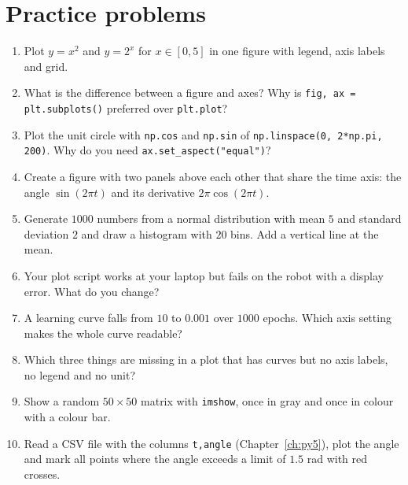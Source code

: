 \section*{Practice problems}
\begin{enumerate}[label=\textbf{\thechapter.\arabic*}]
  \item Plot $y=x^2$ and $y=2^x$ for $x\in[0,5]$ in one figure with legend, axis labels and grid.
  \item What is the difference between a figure and axes? Why is \verb!fig, ax = plt.subplots()! preferred over \texttt{plt.plot}?
  \item Plot the unit circle with \texttt{np.cos} and \texttt{np.sin} of \texttt{np.linspace(0, 2*np.pi, 200)}. Why do you need \verb!ax.set_aspect("equal")!?
  \item Create a figure with two panels above each other that share the time axis: the angle $\sin(2\pi t)$ and its derivative $2\pi\cos(2\pi t)$.
  \item Generate $1000$ numbers from a normal distribution with mean $5$ and standard deviation $2$ and draw a histogram with $20$ bins. Add a vertical line at the mean.
  \item Your plot script works at your laptop but fails on the robot with a display error. What do you change?
  \item A learning curve falls from $10$ to $0.001$ over $1000$ epochs. Which axis setting makes the whole curve readable?
  \item Which three things are missing in a plot that has curves but no axis labels, no legend and no unit?
  \item Show a random $50\times50$ matrix with \texttt{imshow}, once in gray and once in colour with a colour bar.
  \item[\textbf{\thechapter.10}$\star$] Read a CSV file with the columns \texttt{t,angle} (Chapter~\ref{ch:py5}), plot the angle and mark all points where the angle exceeds a limit of $1.5$ rad with red crosses.
\end{enumerate}
